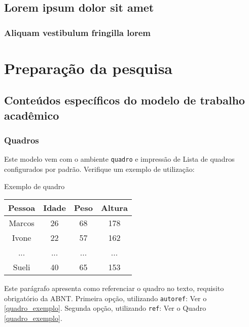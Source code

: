 \documentclass[12pt,openright,oneside,a4paper,chapter=TITLE,section=TITLE,subsection=Title,english,french,spanish,portugues,sumario=tradicional]{04-class-files/abntex2}
\begin{document}
\chapter{Lorem ipsum dolor sit amet}

\section{Aliquam vestibulum fringilla lorem}

\lipsum[1]

\lipsum[2-3]

\part{Preparação da pesquisa}



\chapter{Conteúdos específicos do modelo de trabalho acadêmico}\label{cap_trabalho_academico}

\section{Quadros}

Este modelo vem com o ambiente \texttt{quadro} e impressão de Lista de quadros
configurados por padrão. Verifique um exemplo de utilização:

\begin{quadro}[htb]
\caption{\label{quadro_exemplo}Exemplo de quadro}
\begin{tabular}{|c|c|c|c|}
	\hline
	\textbf{Pessoa} & \textbf{Idade} & \textbf{Peso} & \textbf{Altura} \\ \hline
	Marcos & 26    & 68   & 178    \\ \hline
	Ivone  & 22    & 57   & 162    \\ \hline
	...    & ...   & ...  & ...    \\ \hline
	Sueli  & 40    & 65   & 153    \\ \hline
\end{tabular}
\end{quadro}

Este parágrafo apresenta como referenciar o quadro no texto, requisito
obrigatório da ABNT.
Primeira opção, utilizando \texttt{autoref}: Ver o \autoref{quadro_exemplo}.
Segunda opção, utilizando \texttt{ref}: Ver o Quadro \ref{quadro_exemplo}.
\end{document}

